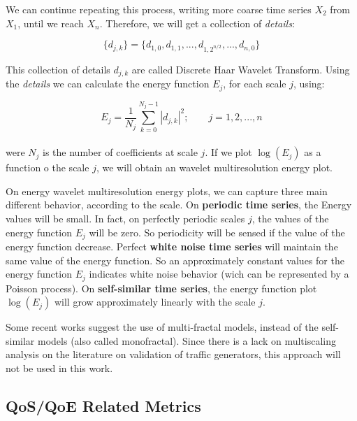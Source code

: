We can continue repeating this process, writing more coarse time series $X_{2}$ from $X_{1}$, until we reach $X_{n}$. Therefore, we will get a collection of \textit{details}:

\begin{equation}
\{d_{j,k}\} = \{ d_{1,0}, d_{1,1}, ..., d_{1,2^{n/2}}, ..., d_{n, 0} \}
\end{equation} 


This collection of details ${d_{j,k}}$ are called Discrete Haar Wavelet Transform. Using the \textit{details} we can calculate the energy function $E_{j}$, for each scale $j$, using:

\begin{equation}
E_{j} = \frac{1}{N_{j}} \sum_{k = 0}^{N_{j} - 1} |d_{j,k}|^{2}; \qquad j = 1, 2, ..., n
\end{equation} 
\\ 
were $N_{j}$ is the number of coefficients at scale $j$. If we plot $\log(E_{j})$ as a function o the scale $j$, we will obtain an wavelet multiresolution energy plot. 

On energy wavelet multiresolution energy plots, we can capture three main different behavior, according to the scale.  On \textbf{periodic time series}, the Energy values will be small. In fact, on perfectly periodic scales $j$, the values of the energy function $E_{j}$ will be zero. So periodicity will be sensed if the value of the energy function decrease. Perfect \textbf{white noise time series} will maintain the same value of the energy function. So an approximately constant values for the energy function $E_{j}$ indicates white noise behavior (wich can be represented by a Poisson process\cite{poisson-white-noise}). On \textbf{self-similar time series}, the energy function plot $\log(E_{j})$ will grow approximately linearly with the scale $j$.  

Some recent works suggest the use of multi-fractal models, instead of the self-similar models (also called monofractal)\cite{validate-trafficgen}\cite{udp-flows-model}. Since there is a lack  on multiscaling analysis on the literature on validation of traffic generators, this approach will not be used in this work. 


\subsection{QoS/QoE Related Metrics}

